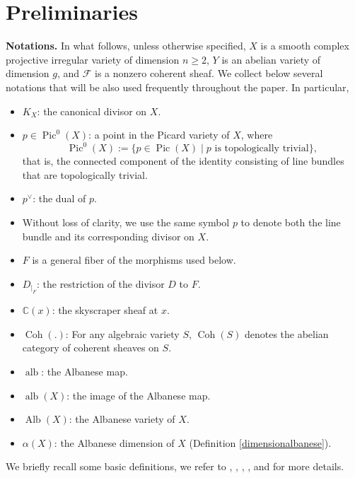 \documentclass[sn-mathphys-num]{sn-jnl}%
\newcommand{\C}{\mathbb{C}}
\theoremstyle{definition}
\numberwithin{equation}{section}
\begin{document}
\section{Preliminaries}\label{sec2}
\textbf{}
\par\textbf{Notations.} In what follows, unless otherwise specified, $X$ is a smooth complex projective irregular variety of dimension $n\geq 2$, $Y$  is an abelian variety of dimension $g$, and $\mathcal{F}$ is a nonzero coherent sheaf. We collect below several notations that will be also used frequently throughout the paper. In particular, 
\begin{itemize}
    \item[]\( K_X \): the canonical divisor on \( X \). 
  \item[] \( p \in \operatorname{Pic}^0(X) \): a point in the Picard variety of \( X \), where
    \[
    \operatorname{Pic}^0(X) := \{ p \in \operatorname{Pic}(X) \mid p \text{ is topologically trivial} \},
    \]
    that is, the connected component of the identity consisting of line bundles that are topologically trivial.
    \item[] \( p^\vee \): the dual of \( p \).
    \item[] Without loss of clarity, we use the same symbol $p$ to denote both the line bundle and its corresponding divisor on $X$.
    \item[] $F$ is a general fiber of the morphisms used below.
    \item[] \( D_{|_F} \): the restriction of the divisor \( D \) to  \( F \).
    \item[] \( \C(x) \): the skyscraper sheaf at $x$.
    \item[] $\operatorname{Coh}(.)$: For any algebraic variety $S$, $\operatorname{Coh}(S)$ denotes the abelian category of coherent sheaves on $S$.
    \item[] $\operatorname{alb}$: the Albanese map.
    \item[] $\operatorname{alb}(X)$: the image of the Albanese map.
    \item[] $\operatorname{Alb}(X)$: the Albanese variety of $X$.
    \item[] $\alpha(X)$: the Albanese dimension of $X$ (Definition \ref{dimensionalbanese}).
    \end{itemize}
\par We briefly  recall some basic definitions, we refer to \cite{popapareschi1}, \cite{haconchen}, \cite{Greenlazarsfeld},  \cite{Nathan}, 
\cite{popasurvey} and \cite{popapareschi} for more details. 
\end{document}
